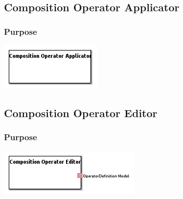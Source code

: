 \documentclass{gemoc} %
\begin{document}
\subsection{Composition Operator Applicator}


\subsubsection{Purpose}


\begin{center}
\includegraphics*[trim=0.0cm 0.0cm 0cm 0.0cm, clip=true]{../images/generated/Generated_Composition_Operator_Applicator.png}
\end{center}




\subsection{Composition Operator Editor}


\subsubsection{Purpose}


\begin{center}
\includegraphics*[trim=0.0cm 0.0cm 0cm 0.0cm, clip=true]{../images/generated/Generated_Composition_Operator_Editor.png}
\end{center}
\end{document}
